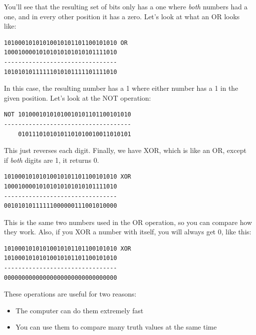You'll see that the resulting set of bits only has a one where 
\emph{both} numbers had a one, and in every other position
it has a zero.  Let's look at what an OR looks like:

\begin{simpletyping}
\begin{lstlisting}
10100010101010010101101100101010 OR 
10001000010101010101010101111010
--------------------------------
10101010111111010101111101111010
\end{lstlisting}
\end{simpletyping}

In this case, the resulting number has a 1 where either number has
a 1 in the given position.  Let's look at the NOT operation:

\begin{simpletyping}
\begin{lstlisting}
NOT 10100010101010010101101100101010
------------------------------------
    01011101010101101010010011010101
\end{lstlisting}
\end{simpletyping}

This just reverses each digit.  Finally, we have XOR, which is
like an OR, except if \emph{both} digits are 1, it
returns 0.

\begin{simpletyping}
\begin{lstlisting}
10100010101010010101101100101010 XOR 
10001000010101010101010101111010
--------------------------------
00101010111111000000111001010000
\end{lstlisting}
\end{simpletyping}

This is the same two numbers used in the OR operation, so you can 
compare how they work.  Also, if you XOR a number with itself, you 
will always get 0, like this:

\begin{simpletyping}
\begin{lstlisting}
10100010101010010101101100101010 XOR 
10100010101010010101101100101010
--------------------------------
00000000000000000000000000000000
\end{lstlisting}
\end{simpletyping}

These operations are useful for two reasons:

\begin{itemize}\item The computer can do them extremely fast 
\item You can use them to compare many truth values at the same time 
\end{itemize}

